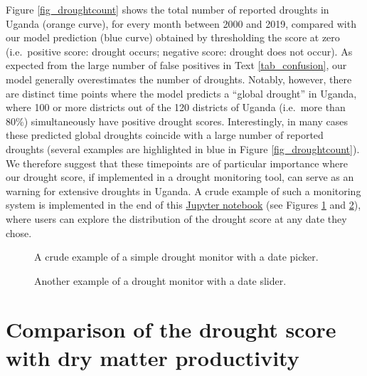\documentclass[10pt,parskip=half,
toc=sectionentrywithdots,
bibliography=totocnumbered,
captions=tableheading,numbers=noendperiod]{scrartcl}
\begin{document}
Figure \ref{fig_droughtcount} shows the total number of reported
droughts in Uganda (orange curve), for every month between 2000 and
2019, compared with our model prediction (blue curve) obtained by
thresholding the score at zero (i.e.~positive score: drought occurs;
negative score: drought does not occur). As expected from the large
number of false positives in Text \ref{tab_confusion}, our model
generally overestimates the number of droughts. Notably, however, there
are distinct time points where the model predicts a ``global drought''
in Uganda, where 100 or more districts out of the 120 districts of
Uganda (i.e.~more than 80\%) simultaneously have positive drought
scores. Interestingly, in many cases these predicted global droughts
coincide with a large number of reported droughts (several examples are
highlighted in blue in Figure \ref{fig_droughtcount}). We therefore
suggest that these timepoints are of particular importance where our
drought score, if implemented in a drought monitoring tool, can serve as
an warning for extensive droughts in Uganda. A crude example of such a
monitoring system is implemented in the end of this
\href{https://github.com/rodekruis/IBF-system/blob/master/trigger-model-development/drought/skill-assessment/Model\%20Event\%20Data/Uganda_logit_model.ipynb}{Jupyter
notebook} (see Figures \ref{fig_monitor} and \ref{fig_monitor_2}), where
users can explore the distribution of the drought score at any date they
chose.

\begin{figure}[H]
\hypertarget{fig_monitor}{%
\begin{center}
\end{center}
\caption{A crude example of a simple drought monitor with a date picker.}\label{fig_monitor}
}
\end{figure}

\begin{figure}[H]
\hypertarget{fig_monitor_2}{%
\begin{center}
\end{center}
\caption{Another example of a drought monitor with a date slider.}\label{fig_monitor_2}
}
\end{figure}

\hypertarget{comparison-of-the-drought-score-with-dry-matter-productivity}{%
\section{Comparison of the drought score with dry matter
productivity}\label{comparison-of-the-drought-score-with-dry-matter-productivity}}
\end{document}
